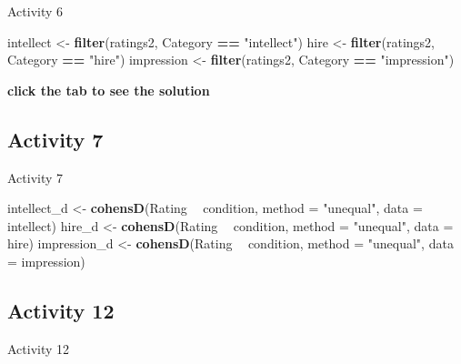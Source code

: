 \documentclass[]{book}
\newenvironment{Shaded}{\begin{snugshade}}{\end{snugshade}}
\newcommand{\DataTypeTok}[1]{\textcolor[rgb]{0.13,0.29,0.53}{#1}}
\newcommand{\KeywordTok}[1]{\textcolor[rgb]{0.13,0.29,0.53}{\textbf{#1}}}
\newcommand{\NormalTok}[1]{#1}
\newcommand{\OperatorTok}[1]{\textcolor[rgb]{0.81,0.36,0.00}{\textbf{#1}}}
\newcommand{\StringTok}[1]{\textcolor[rgb]{0.31,0.60,0.02}{#1}}
\begin{document}
Activity 6

\begin{Shaded}
\begin{Highlighting}[]
\NormalTok{intellect <-}\StringTok{ }\KeywordTok{filter}\NormalTok{(ratings2, Category }\OperatorTok{==}\StringTok{ "intellect"}\NormalTok{)}
\NormalTok{hire <-}\StringTok{ }\KeywordTok{filter}\NormalTok{(ratings2, Category }\OperatorTok{==}\StringTok{ "hire"}\NormalTok{)}
\NormalTok{impression <-}\StringTok{ }\KeywordTok{filter}\NormalTok{(ratings2, Category }\OperatorTok{==}\StringTok{ "impression"}\NormalTok{)}
\end{Highlighting}
\end{Shaded}

\textbf{click the tab to see the solution}

\hypertarget{activity-7-2}{%
\subsection{Activity 7}\label{activity-7-2}}

Activity 7

\begin{Shaded}
\begin{Highlighting}[]
\NormalTok{intellect_d <-}\StringTok{ }\KeywordTok{cohensD}\NormalTok{(Rating }\OperatorTok{~}\StringTok{ }\NormalTok{condition, }\DataTypeTok{method =} \StringTok{"unequal"}\NormalTok{, }\DataTypeTok{data =}\NormalTok{ intellect)}
\NormalTok{hire_d <-}\StringTok{ }\KeywordTok{cohensD}\NormalTok{(Rating }\OperatorTok{~}\StringTok{ }\NormalTok{condition, }\DataTypeTok{method =} \StringTok{"unequal"}\NormalTok{, }\DataTypeTok{data =}\NormalTok{ hire)}
\NormalTok{impression_d <-}\StringTok{ }\KeywordTok{cohensD}\NormalTok{(Rating }\OperatorTok{~}\StringTok{ }\NormalTok{condition, }\DataTypeTok{method =} \StringTok{"unequal"}\NormalTok{, }\DataTypeTok{data =}\NormalTok{ impression)}
\end{Highlighting}
\end{Shaded}

\hypertarget{activity-12}{%
\subsection{Activity 12}\label{activity-12}}

Activity 12

\begin{Shaded}
\end{Shaded}
\end{document}
